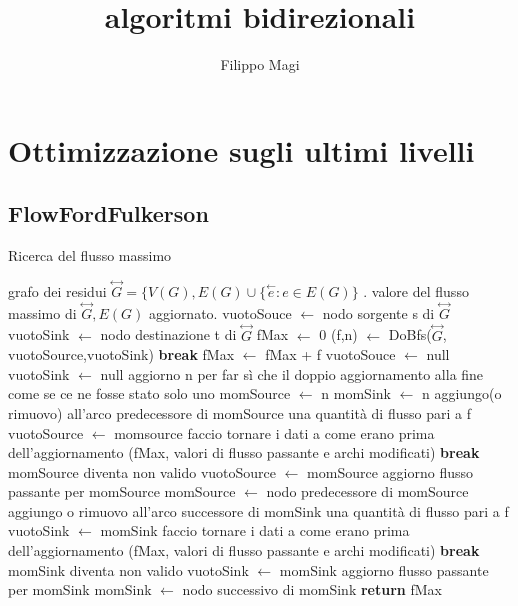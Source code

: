 \documentclass{article}
\title{algoritmi bidirezionali}
\author{Filippo Magi }
\begin{document}
\maketitle
\section{Ottimizzazione sugli ultimi livelli}
\subsection{FlowFordFulkerson}
\begin{algorithm}
\caption{Ricerca del flusso massimo}
\begin{algorithmic}[1]
\REQUIRE grafo dei residui $\overset{\leftrightarrow}{G} = \{V(G),E(G) \cup \{ \overset{\leftarrow}{e} : e \in E(G) \}$ .
\ENSURE valore del flusso massimo di $\overset{\leftrightarrow}{G} , E(G)$ aggiornato.
\STATE vuotoSouce $\leftarrow$ nodo sorgente s  di $\overset{\leftrightarrow}{G}$
\STATE vuotoSink $\leftarrow$ nodo destinazione t  di $\overset{\leftrightarrow}{G}$
\STATE fMax $\leftarrow$ 0
\LOOP
\STATE (f,n) $\leftarrow$ DoBfs($\overset{\leftrightarrow}{G}$, vuotoSource,vuotoSink)
\STATE \textbf{break}
\ENDIF
fMax $\leftarrow$ fMax + f
\STATE vuotoSouce $\leftarrow$ null
\STATE vuotoSink $\leftarrow$ null
\STATE aggiorno n per far sì che il doppio aggiornamento alla fine come se ce ne fosse stato solo uno
\STATE momSource $\leftarrow$ n
\STATE momSink $\leftarrow$ n
\STATE aggiungo(o rimuovo) all'arco predecessore di momSource una quantità di flusso pari a f
\STATE vuotoSource $\leftarrow$ momsource
\STATE faccio tornare i dati a come erano prima dell'aggiornamento (fMax, valori di flusso passante e archi modificati)
\STATE \textbf{break}
\ELSE
{}
\STATE momSource diventa non valido
\STATE vuotoSource $\leftarrow$ momSource
\ENDIF
\STATE aggiorno flusso passante per momSource
\STATE momSource $\leftarrow$ nodo predecessore di momSource
\ENDIF
\ENDWHILE
{}
\STATE aggiungo o rimuovo all'arco successore di momSink una quantità di flusso pari a f
\STATE vuotoSink $\leftarrow$ momSink
\STATE faccio tornare i dati a come erano prima dell'aggiornamento (fMax, valori di flusso passante e archi modificati)
\STATE \textbf{break}
\ELSE
{}
\STATE momSink diventa non valido
\STATE vuotoSink $\leftarrow$ momSink
\ENDIF
\STATE aggiorno flusso passante per momSink
\STATE momSink $\leftarrow$ nodo successivo di momSink
\ENDIF
\ENDWHILE
\ENDLOOP
\STATE \textbf{return} fMax
\end{algorithmic}
\end{algorithm}
\end{document}
